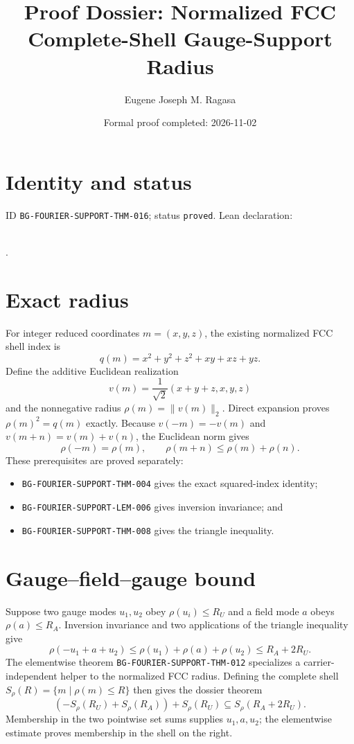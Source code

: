 \documentclass[11pt]{article}
\title{Proof Dossier: Normalized FCC Complete-Shell Gauge-Support Radius}\author{Eugene Joseph M. Ragasa}\date{Formal proof completed: 2026-11-02}
\begin{document}
\maketitle
\section{Identity and status}
ID \texttt{BG-FOURIER-SUPPORT-THM-016}; status \texttt{proved}. Lean declaration:
\par{}\\
{\tiny{}}.

\section{Exact radius}
For integer reduced coordinates $m=(x,y,z)$, the existing normalized FCC shell index is
\[
 q(m)=x^2+y^2+z^2+xy+xz+yz.
\]
Define the additive Euclidean realization
\[
 v(m)=\frac{1}{\sqrt 2}(x+y+z,x,y,z)
\]
and the nonnegative radius $\rho(m)=\lVert v(m)\rVert_2$. Direct expansion proves
$\rho(m)^2=q(m)$ exactly. Because $v(-m)=-v(m)$ and $v(m+n)=v(m)+v(n)$, the Euclidean norm gives
\[
 \rho(-m)=\rho(m),\qquad \rho(m+n)\leq\rho(m)+\rho(n).
\]
These prerequisites are proved separately:
\begin{itemize}
\item \texttt{BG-FOURIER-SUPPORT-THM-004} gives the exact squared-index identity;
\item \texttt{BG-FOURIER-SUPPORT-LEM-006} gives inversion invariance; and
\item \texttt{BG-FOURIER-SUPPORT-THM-008} gives the triangle inequality.
\end{itemize}

\section{Gauge--field--gauge bound}
Suppose two gauge modes $u_1,u_2$ obey $\rho(u_i)\leq R_U$ and a field mode $a$ obeys
$\rho(a)\leq R_A$. Inversion invariance and two applications of the triangle inequality give
\[
 \rho(-u_1+a+u_2)
 \leq \rho(u_1)+\rho(a)+\rho(u_2)
 \leq R_A+2R_U.
\]
The elementwise theorem \texttt{BG-FOURIER-SUPPORT-THM-012} specializes a carrier-independent
helper to the normalized FCC radius. Defining the complete shell
$S_\rho(R)=\{m\mid \rho(m)\leq R\}$ then gives the dossier theorem
\[
 (-S_\rho(R_U)+S_\rho(R_A))+S_\rho(R_U)
 \subseteq S_\rho(R_A+2R_U).
\]
Membership in the two pointwise set sums supplies $u_1,a,u_2$; the elementwise estimate proves
membership in the shell on the right.
\end{document}
